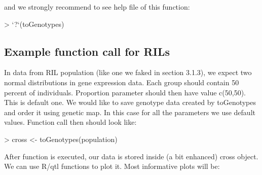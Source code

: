 \documentclass{article}
\begin{document}
{\noindent}and we strongly recommend to see help file of this function:
\begin{Schunk}
\begin{Sinput}
> `?`(toGenotypes)
\end{Sinput}
\end{Schunk}

\subsection{Example function call for RILs}
In data from RIL population (like one we faked in section 3.1.3), we expect two normal distributions in gene expression data. Each group should contain 50 percent of individuals. Proportion parameter should then have value c(50,50).
This is default one. We would like to save genotype data created by toGenotypes and order it using genetic map. In this case for all the parameters we use default values.  Function call then should look like:
\begin{Schunk}
\begin{Sinput}
> cross <- toGenotypes(population)
\end{Sinput}
\end{Schunk}

{\noindent}After function is executed, our data is stored inside (a bit enhanced) cross object. We can use R/qtl functions to plot it. Most informative plots will be:
\end{document}
